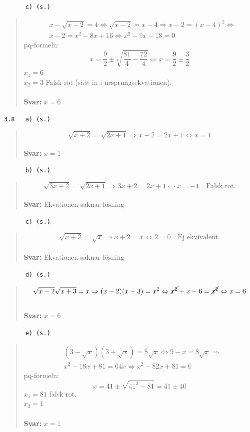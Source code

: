 \documentclass[a4paper]{article}
\newcommand{\tskcol}[1]{\textcolor{tskcol}{#1}}
\begin{document}
	\texttt{\tskcol{~~~~~~c) (s.)}}
	\begin{quotation}
		\noindent
		\begin{align*}
		&x-\sqrt{x-2}=4 \Leftrightarrow
		\sqrt{x-2}=x-4 \Rightarrow
		x-2=(x-4)^2 \Leftrightarrow \\
		&x-2=x^2-8x+16 \Leftrightarrow
		x^2-9x+18=0
		\end{align*}
		pq-formeln: \\
		\[x=\frac{9}{2}\pm\sqrt{\frac{81}{4}-\frac{72}{4}} \Leftrightarrow
		x=\frac{9}{2}\pm\frac{3}{2}\]
		$x_1=6$ \\
		$x_2=3$ Falsk rot (sätt in i ursprungsekvationen).
		\\ \\
		\textbf{Svar:} $x=6$
	\end{quotation}
	
	\texttt{\tskcol{3.8~~~a) (s.)}}
	\begin{quotation}
		\noindent
		\[\sqrt{x+2}=\sqrt{2x+1} \Rightarrow
		x+2=2x+1 \Leftrightarrow
		x=1\]
		\\
		\textbf{Svar:} $x=1$
	\end{quotation}
	
	\pagebreak
	\texttt{\tskcol{~~~~~~b) (s.)}}
	\begin{quotation}
		\noindent
		\[\sqrt{3x+2}=\sqrt{2x+1} \Rightarrow
		3x+2=2x+1 \Leftrightarrow
		x=-1 \text{~~~Falsk rot.}\]
		\\
		\textbf{Svar:} Ekvationen saknar lösning
	\end{quotation}
	
	\texttt{\tskcol{~~~~~~c) (s.)}}
	\begin{quotation}
		\noindent
		\[\sqrt{x+2}=\sqrt{x} \Rightarrow
		x+2=x \Leftrightarrow
		2=0 \text{~~~Ej ekvivalent.}\]
		\\
		\textbf{Svar:} Ekvationen saknar lösning
	\end{quotation}
		
	\texttt{\tskcol{~~~~~~d) (s.)}}
	\begin{quotation}
		\noindent
		\[\sqrt{x-2}\sqrt{x+3}=x \Rightarrow
		(x-2)(x+3)=x^2 \Leftrightarrow
		\cancel{x^2}+x-6=\cancel{x^2} \Leftrightarrow
		x=6\]
		\\
		\textbf{Svar:} $x=6$
	\end{quotation}
	
	\texttt{\tskcol{~~~~~~e) (s.)}}
	\begin{quotation}
		\noindent
		\begin{align*}
		&(3-\sqrt{x})(3+\sqrt{x})=8\sqrt{x} \Leftrightarrow
		9-x=8\sqrt{x} \Rightarrow \\
		&x^2-18x+81=64x \Leftrightarrow
		x^2-82x+81=0
		\end{align*}
		pq-formeln: \\
		\[x=41\pm\sqrt{41^2-81}=41\pm40\]
		$x_1=81$ falsk rot. \\
		$x_2=1$
		\\ \\
		\textbf{Svar:} $x=1$
	\end{quotation}
		
\end{document}

